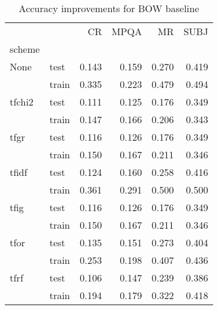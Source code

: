 \begin{table}[H]
\begin{center}

\begin{tabular}{llrrrr}
\toprule
{} &      &  CR &  MPQA &  MR &  SUBJ \\
scheme &  &            &              &            &              \\
\midrule
None & test &      0.143 &        0.159 &      0.270 &        0.419 \\
{} & train &      0.335 &        0.223 &      0.479 &        0.494 \\
tfchi2 & test &      0.111 &        0.125 &      0.176 &        0.349 \\
{} & train &      0.147 &        0.166 &      0.206 &        0.343 \\
tfgr & test &      0.116 &        0.126 &      0.176 &        0.349 \\
{} & train &      0.150 &        0.167 &      0.211 &        0.346 \\
tfidf & test &      0.124 &        0.160 &      0.258 &        0.416 \\
{} & train &      0.361 &        0.291 &      0.500 &        0.500 \\
tfig & test &      0.116 &        0.126 &      0.176 &        0.349 \\
{} & train &      0.150 &        0.167 &      0.211 &        0.346 \\
tfor & test &      0.135 &        0.151 &      0.273 &        0.404 \\
{} & train &      0.253 &        0.198 &      0.407 &        0.436 \\
tfrf & test &      0.106 &        0.147 &      0.239 &        0.386 \\
{} & train &      0.194 &        0.179 &      0.322 &        0.418 \\
\bottomrule
\end{tabular}

\caption[Accuracy improvements for BOW baseline]{Accuracy improvements for BOW baseline}
\label{tab:}
\end{center}
\end{table}

